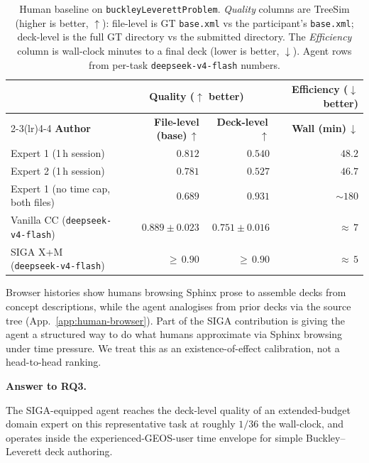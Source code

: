 \documentclass{article}
\newif\ifrqfancy
\newenvironment{rqanswer}[1]{%
  \ifrqfancy\begin{rqbox}\fi\noindent\textbf{Answer to #1.}\ %
}{%
  \ifrqfancy\end{rqbox}\else\par\smallskip\fi%
}
\begin{document}
\begin{table}[h]
  \caption{Human baseline on \texttt{buckleyLeverettProblem}. \emph{Quality} columns are TreeSim (higher is better, $\uparrow$): file-level is GT \texttt{base.xml} vs the participant's \texttt{base.xml}; deck-level is the full GT directory vs the submitted directory. The \emph{Efficiency} column is wall-clock minutes to a final deck (lower is better, $\downarrow$). Agent rows from per-task \texttt{deepseek-v4-flash} numbers.}
  \label{tab:human-baseline}
  \centering
  \small
  \begin{tabular}{lrrr}
    \toprule
    & \multicolumn{2}{c}{\textbf{Quality} ($\uparrow$ better)} & \textbf{Efficiency} ($\downarrow$ better) \\
    \cmidrule(lr){2-3}\cmidrule(lr){4-4}
    \textbf{Author} & \textbf{File-level (base)}\,$\uparrow$ & \textbf{Deck-level}\,$\uparrow$ & \textbf{Wall (min)}\,$\downarrow$ \\
    \midrule
    Expert 1 (1\,h session)                         & $0.812$            & $0.540$            & $48.2$ \\
    Expert 2 (1\,h session)                         & $0.781$            & $0.527$            & $46.7$ \\
    Expert 1 (no time cap, both files)              & $0.689$            & $0.931$            & ${\sim}180$ \\
    Vanilla CC (\texttt{deepseek-v4-flash})   & $0.889 \pm 0.023$  & $0.751 \pm 0.016$  & ${\approx}\,7$ \\
    SIGA X+M (\texttt{deepseek-v4-flash})     & ${\geq}\,0.90$     & ${\geq}\,0.90$     & ${\approx}\,5$ \\
    \bottomrule
  \end{tabular}
\end{table}

Browser histories show humans browsing Sphinx prose to assemble decks from concept descriptions, while the agent analogises from prior decks via the source tree (App.~\ref{app:human-browser}). Part of the SIGA contribution is giving the agent a structured way to do what humans approximate via Sphinx browsing under time pressure. We treat this as an existence-of-effect calibration, not a head-to-head ranking.

\begin{rqanswer}{RQ3}
The SIGA-equipped agent reaches the deck-level quality of an extended-budget domain expert on this representative task at roughly $1/36$ the wall-clock, and operates inside the experienced-GEOS-user time envelope for simple Buckley--Leverett deck authoring.
\end{rqanswer}
\end{document}

